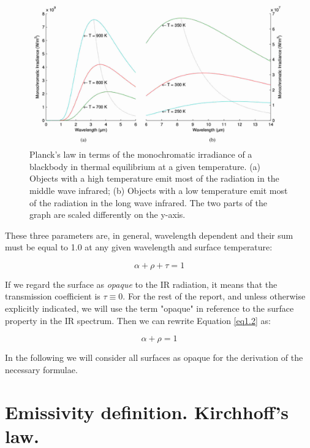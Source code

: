 		\begin{figure}[ht!]
			\centering
			\captionsetup{justification=centering,margin=2cm}
			\includegraphics[scale=0.35]{Figures/Chapter01/PlankFunction.jpg}
			\caption{Planck’s law in terms of the  monochromatic irradiance of  a blackbody in thermal equilibrium at a given temperature. (a) Objects with a high temperature emit most of the radiation in the middle wave infrared; (b) Objects with a low temperature emit most of the radiation in the long wave infrared. The two parts of the graph are scaled differently on the y-axis.}\label{fig1.3}
		\end{figure}		
		
		These three parameters are, in general, wavelength dependent and their sum must be equal to 1.0 at any given wavelength and surface temperature:
		
		\begin{equation}\label{eq1.2}
			\alpha + \rho + \tau = 1
		\end{equation}\bigskip
		
		If we regard the surface as \textit{opaque} to the IR radiation, it means that the transmission coefficient is $\tau \equiv 0$. For the rest of the report, and unless otherwise explicitly indicated, we will use the term "opaque" in reference to the surface property in the IR spectrum. Then we can rewrite Equation \ref{eq1.2} as:	
		
		\begin{equation}\label{eq1.3}
			\alpha + \rho = 1
		\end{equation}\bigskip
		
		In the following we will consider all surfaces as opaque for the derivation of the necessary formulae.\bigskip
		
	\section{Emissivity definition. Kirchhoff's law.}\label{section1.3}
		
